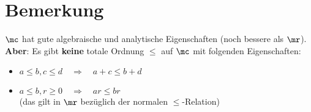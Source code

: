 \section{Bemerkung}
	$\mc$ hat gute algebraische und analytische Eigenschaften (noch bessere als $\mr$).\\
	\textbf{Aber}: Es gibt \textbf{keine} totale Ordnung $\leq$ auf $\mc$ mit folgenden Eigenschaften:
	\begin{itemize}
		\item $a\leq b, c\leq d \quad \Rightarrow \quad a+c\leq b+d$
		\item $a\leq b, r\geq 0 \quad \Rightarrow \quad ar\leq br$\\
			(das gilt in $\mr$ bezüglich der normalen $\leq$-Relation)
	\end{itemize}
